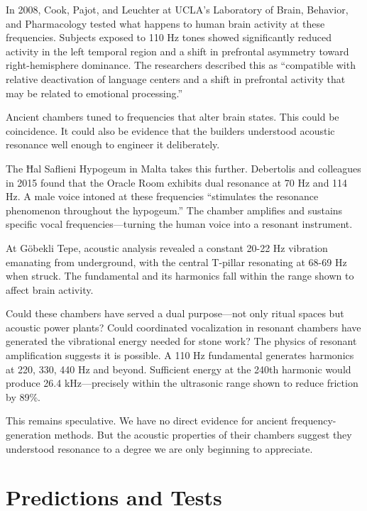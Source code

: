 \documentclass[11pt]{article}
\begin{document}
In 2008, Cook, Pajot, and Leuchter at UCLA's Laboratory of Brain, Behavior, and Pharmacology tested what happens to human brain activity at these frequencies. Subjects exposed to 110 Hz tones showed significantly reduced activity in the left temporal region and a shift in prefrontal asymmetry toward right-hemisphere dominance. The researchers described this as ``compatible with relative deactivation of language centers and a shift in prefrontal activity that may be related to emotional processing.''

Ancient chambers tuned to frequencies that alter brain states. This could be coincidence. It could also be evidence that the builders understood acoustic resonance well enough to engineer it deliberately.

The Ħal Saflieni Hypogeum in Malta takes this further. Debertolis and colleagues in 2015 found that the Oracle Room exhibits dual resonance at 70 Hz and 114 Hz. A male voice intoned at these frequencies ``stimulates the resonance phenomenon throughout the hypogeum.'' The chamber amplifies and sustains specific vocal frequencies---turning the human voice into a resonant instrument.

At Göbekli Tepe, acoustic analysis revealed a constant 20-22 Hz vibration emanating from underground, with the central T-pillar resonating at 68-69 Hz when struck. The fundamental and its harmonics fall within the range shown to affect brain activity.

Could these chambers have served a dual purpose---not only ritual spaces but acoustic power plants? Could coordinated vocalization in resonant chambers have generated the vibrational energy needed for stone work? The physics of resonant amplification suggests it is possible. A 110 Hz fundamental generates harmonics at 220, 330, 440 Hz and beyond. Sufficient energy at the 240th harmonic would produce 26.4 kHz---precisely within the ultrasonic range shown to reduce friction by 89\%.

This remains speculative. We have no direct evidence for ancient frequency-generation methods. But the acoustic properties of their chambers suggest they understood resonance to a degree we are only beginning to appreciate.

\section{Predictions and Tests}
\end{document}
